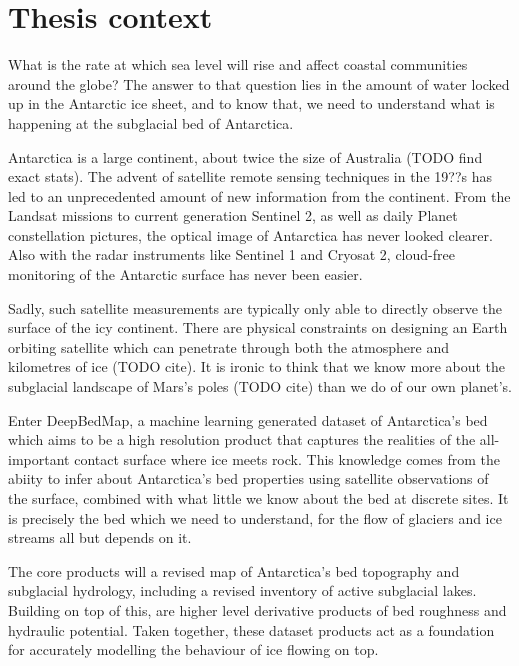 
\section{Thesis context}

What is the rate at which sea level will rise and affect coastal communities around the globe?
The answer to that question lies in the amount of water locked up in the Antarctic ice sheet, and to know that, we need to understand what is happening at the subglacial bed of Antarctica.

Antarctica is a large continent, about twice the size of Australia (TODO find exact stats).
The advent of satellite remote sensing techniques in the 19??s has led to an unprecedented amount of new information from the continent.
From the Landsat missions to current generation Sentinel 2, as well as daily Planet constellation pictures, the optical image of Antarctica has never looked clearer.
Also with the radar instruments like Sentinel 1 and Cryosat 2, cloud-free monitoring of the Antarctic surface has never been easier.

Sadly, such satellite measurements are typically only able to directly observe the surface of the icy continent.
There are physical constraints on designing an Earth orbiting satellite which can penetrate through both the atmosphere and kilometres of ice (TODO cite).
It is ironic to think that we know more about the subglacial landscape of Mars's poles (TODO cite) than we do of our own planet's.

Enter DeepBedMap, a machine learning generated dataset of Antarctica's bed which aims to be a high resolution product that captures the realities of the all-important contact surface where ice meets rock.
This knowledge comes from the abiity to infer about Antarctica's bed properties using satellite observations of the surface, combined with what little we know about the bed at discrete sites.
It is precisely the bed which we need to understand, for the flow of glaciers and ice streams all but depends on it.

The core products will a revised map of Antarctica's bed topography and subglacial hydrology, including a revised inventory of active subglacial lakes.
Building on top of this, are higher level derivative products of bed roughness and hydraulic potential.
Taken together, these dataset products act as a foundation for accurately modelling the behaviour of ice flowing on top.

